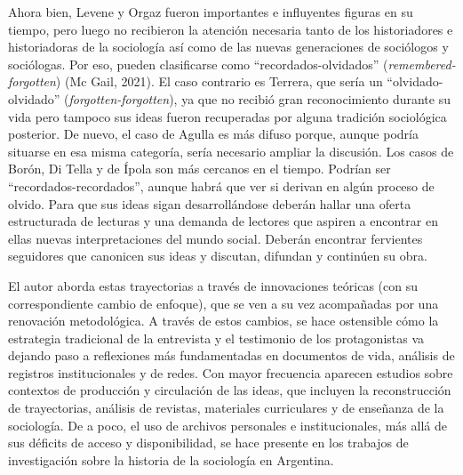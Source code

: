 Ahora bien, Levene y Orgaz fueron importantes e influyentes figuras en su tiempo, pero luego no recibieron la atención necesaria tanto de los historiadores e historiadoras de la sociología así como de las nuevas generaciones de sociólogos y sociólogas. Por eso, pueden clasificarse como \enquote{recordados-olvidados} (\emph{remembered- forgotten}) \parencite{280-BARGHEER2024}(Mc Gail, 2021). El caso contrario es Terrera, que sería un \enquote{olvidado-olvidado} (\emph{forgotten-forgotten}), ya que no recibió gran reconocimiento durante su vida pero tampoco sus ideas fueron recuperadas por alguna tradición sociológica posterior. De nuevo, el caso de Agulla es más difuso porque, aunque podría situarse en esa misma categoría, sería necesario ampliar la discusión. Los casos de Borón, Di Tella y de Ípola son más cercanos en el tiempo. Podrían ser \enquote{recordados-recordados}, aunque habrá que ver si derivan en algún proceso de olvido. Para que sus ideas sigan desarrollándose deberán hallar una oferta estructurada de lecturas y una demanda de lectores que aspiren a encontrar en ellas nuevas interpretaciones del mundo social. Deberán encontrar fervientes seguidores que canonicen sus ideas y discutan, difundan y continúen su obra.

El autor aborda estas trayectorias a través de innovaciones teóricas (con su correspondiente cambio de enfoque), que se ven a su vez acompañadas por una renovación metodológica. A través de estos cambios, se hace ostensible cómo la estrategia tradicional de la entrevista y el testimonio de los protagonistas va dejando paso a reflexiones más fundamentadas en documentos de vida, análisis de registros institucionales y de redes. Con mayor frecuencia aparecen estudios sobre contextos de producción y circulación de las ideas, que incluyen la reconstrucción de trayectorias, análisis de revistas, materiales curriculares y de enseñanza de la sociología. De a poco, el uso de archivos personales e institucionales, más allá de sus déficits de acceso y disponibilidad, se hace presente en los trabajos de investigación sobre la historia de la sociología en Argentina.


